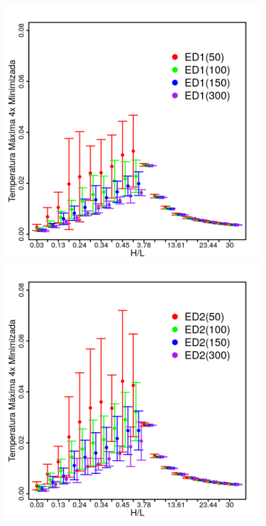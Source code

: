 \documentclass[12pt,A4,A4pt]{article}
\begin{document}
\begin{figure}[htbp]
\centering
\includegraphics[scale=.91]{imgs/plot_de1_rdata_std.png}
\quad
\includegraphics[scale=.91]{imgs/plot_de2_rdata_std.png}

\end{figure}
\end{document}
